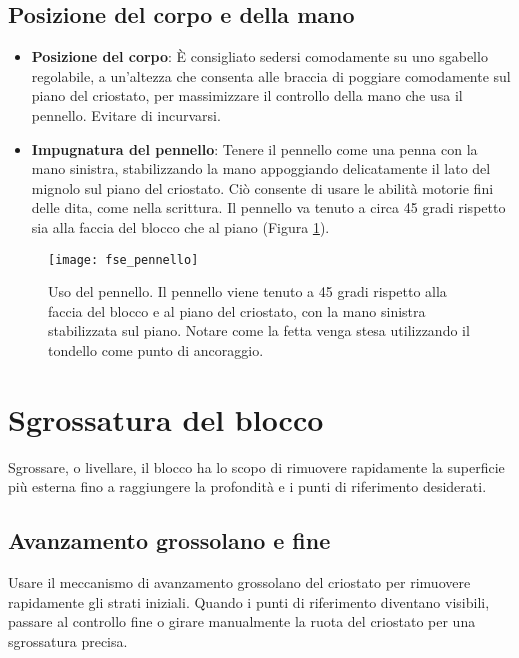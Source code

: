 \subsection{Posizione del corpo e della mano}
\begin{itemize}
    \item \textbf{Posizione del corpo}: È consigliato sedersi comodamente su uno sgabello regolabile, a un'altezza che consenta alle braccia di poggiare comodamente sul piano del criostato, per massimizzare il controllo della mano che usa il pennello. Evitare di incurvarsi. 
    \item \textbf{Impugnatura del pennello}: Tenere il pennello come una penna con la mano sinistra, stabilizzando la mano appoggiando delicatamente il lato del mignolo sul piano del criostato. Ciò consente di usare le abilità motorie fini delle dita, come nella scrittura. Il pennello va tenuto a circa 45 gradi rispetto sia alla faccia del blocco che al piano (Figura \ref{fig:fse_pennello}). 
\end{itemize}

\begin{figure}[htbp]
    \centering
    \texttt{[image: fse\_pennello]}
    \caption{Uso del pennello. Il pennello viene tenuto a 45 gradi rispetto alla faccia del blocco e al piano del criostato, con la mano sinistra stabilizzata sul piano. Notare come la fetta venga stesa utilizzando il tondello come punto di ancoraggio.}
    \label{fig:fse_pennello}
\end{figure}

\section{Sgrossatura del blocco}
Sgrossare, o livellare, il blocco ha lo scopo di rimuovere rapidamente la superficie più esterna fino a raggiungere la profondità e i punti di riferimento desiderati.

\subsection{Avanzamento grossolano e fine}
Usare il meccanismo di avanzamento grossolano del criostato per rimuovere rapidamente gli strati iniziali. Quando i punti di riferimento diventano visibili, passare al controllo fine o girare manualmente la ruota del criostato per una sgrossatura precisa.

